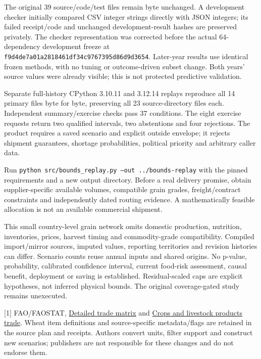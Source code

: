 \documentclass[11pt,letterpaper]{article}
\newcommand{\heading}[1]{\vspace{4pt}{\large\bfseries #1}\par}
\newcommand{\BoundDC}{37}
\begin{document}
The original 39 source/code/test files remain byte unchanged. A development checker initially compared CSV integer strings directly with JSON integers; its failed receipt/code and unchanged development-result hashes are preserved privately. The checker representation was corrected before the actual 64-dependency development freeze at \texttt{f9d4de7a01a2818461df34c9767395d86d9d3654}. Later-year results use identical frozen methods, with no tuning or outcome-driven subset change. Both years' source values were already visible; this is not protected predictive validation.

Separate full-history CPython 3.10.11 and 3.12.14 replays reproduce all 14 primary files byte for byte, preserving all 23 source-directory files each. Independent summary/exercise checks pass \BoundDC{} conditions. The eight exercise requests return two qualified intervals, two abstentions and four rejections. The product requires a saved scenario and explicit outside envelope; it rejects shipment guarantees, shortage probabilities, political priority and arbitrary caller data.

Run \texttt{python src/bounds\_replay.py --out ../bounds-replay} with the pinned requirements and a new output directory. Before a real delivery promise, obtain supplier-specific available volumes, compatible grain grades, freight/contract constraints and independently dated routing evidence. A mathematically feasible allocation is not an available commercial shipment.

\heading{Limits, sources and publication boundary}
This small country-level grain network omits domestic production, nutrition, inventories, prices, harvest timing and commodity-grade compatibility. Compiled import/mirror sources, imputed values, reporting territories and revision histories can differ. Scenario counts reuse annual inputs and shared origins. No p-value, probability, calibrated confidence interval, current food-risk assessment, causal benefit, deployment or saving is established. Residual-scaled caps are explicit hypotheses, not inferred physical bounds. The original coverage-gated study remains unexecuted.

[1] FAO/FAOSTAT, \href{https://www.fao.org/faostat/en/#data/TM/metadata}{Detailed trade matrix} and \href{https://www.fao.org/faostat/en/#data/TCL/metadata}{Crops and livestock products trade}. Wheat item definitions and source-specific metadata/flags are retained in the source plan and receipts. Authors convert units, filter support and construct new scenarios; publishers are not responsible for these changes and do not endorse them.
\end{document}
